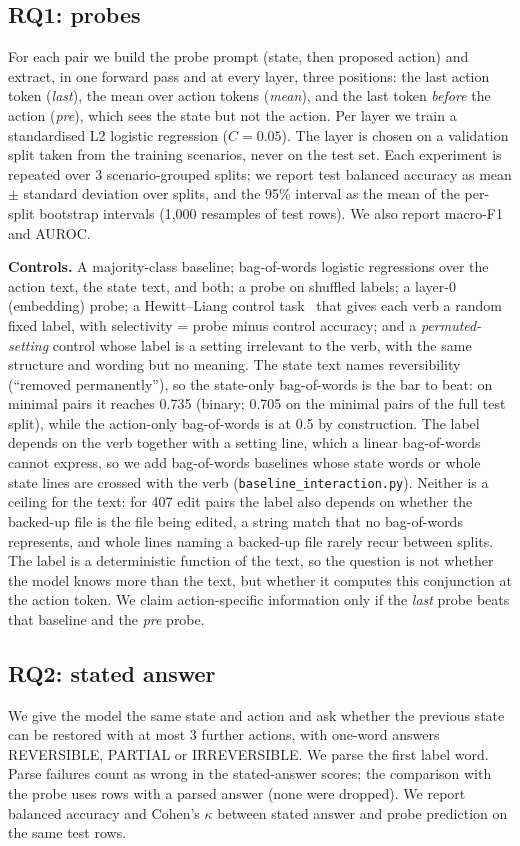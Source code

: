 \documentclass[conference]{IEEEtran}
\begin{document}
\subsection{RQ1: probes}
For each pair we build the probe prompt (state, then proposed action) and extract, in one forward pass and at every layer, three positions: the last action token (\emph{last}), the mean over action tokens (\emph{mean}), and the last token \emph{before} the action (\emph{pre}), which sees the state but not the action. Per layer we train a standardised L2 logistic regression ($C=0.05$). The layer is chosen on a validation split taken from the training scenarios, never on the test set. Each experiment is repeated over 3 scenario-grouped splits; we report test balanced accuracy as mean $\pm$ standard deviation over splits, and the 95\% interval as the mean of the per-split bootstrap intervals (1{,}000 resamples of test rows). We also report macro-F1 and AUROC.

\textbf{Controls.} A majority-class baseline; bag-of-words logistic regressions over the action text, the state text, and both; a probe on shuffled labels; a layer-0 (embedding) probe; a Hewitt--Liang control task~\cite{hewitt2019control} that gives each verb a random fixed label, with selectivity = probe minus control accuracy; and a \emph{permuted-setting} control whose label is a setting irrelevant to the verb, with the same structure and wording but no meaning. The state text names reversibility (``removed permanently''), so the state-only bag-of-words is the bar to beat: on minimal pairs it reaches 0.735 (binary; 0.705 on the minimal pairs of the full test split), while the action-only bag-of-words is at 0.5 by construction. The label depends on the verb together with a setting line, which a linear bag-of-words cannot express, so we add bag-of-words baselines whose state words or whole state lines are crossed with the verb (\texttt{baseline\_interaction.py}). Neither is a ceiling for the text: for 407 edit pairs the label also depends on whether the backed-up file is the file being edited, a string match that no bag-of-words represents, and whole lines naming a backed-up file rarely recur between splits. The label is a deterministic function of the text, so the question is not whether the model knows more than the text, but whether it computes this conjunction at the action token. We claim action-specific information only if the \emph{last} probe beats that baseline and the \emph{pre} probe.

\subsection{RQ2: stated answer}
We give the model the same state and action and ask whether the previous state can be restored with at most 3 further actions, with one-word answers REVERSIBLE, PARTIAL or IRREVERSIBLE. We parse the first label word. Parse failures count as wrong in the stated-answer scores; the comparison with the probe uses rows with a parsed answer (none were dropped). We report balanced accuracy and Cohen's $\kappa$ between stated answer and probe prediction on the same test rows.
\end{document}
